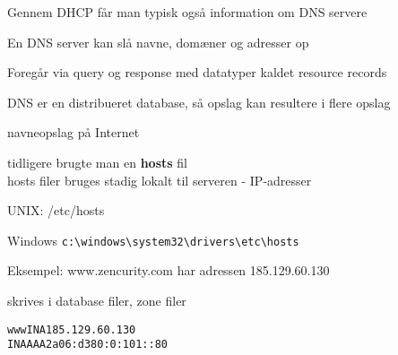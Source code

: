 \documentclass[Screen16to9,17pt]{foils}
\begin{document}




\begin{list1}
\item Gennem DHCP får man typisk også information om DNS servere
\item En DNS server kan slå navne, domæner og adresser op
\item Foregår via query og response med datatyper kaldet resource records
\item DNS er en distribueret database, så opslag kan resultere i flere opslag
\end{list1}


\begin{list1}
\item navneopslag på Internet
\item tidligere brugte man en {\bfseries hosts} fil\\
hosts filer bruges stadig lokalt til serveren - IP-adresser
\item UNIX: /etc/hosts
\item Windows \verb+c:\windows\system32\drivers\etc\hosts+
\item Eksempel: www.zencurity.com har adressen 185.129.60.130
\item skrives i database filer, zone filer
\end{list1}

\begin{alltt}
www     IN      A       185.129.60.130
        IN      AAAA    2a06:d380:0:101::80
\end{alltt}
\end{document}
